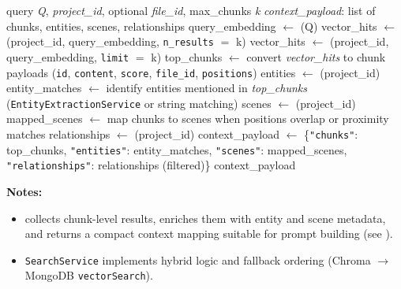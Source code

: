 \begin{algorithm}[H]
\caption{AssembleRAGContext}
\small\begin{algorithmic}[1]
\Require query \textit{Q}, \textit{project\_id}, optional \textit{file\_id}, max\_chunks \textit{k}
\Ensure \textit{context\_payload}: list of chunks, entities, scenes, relationships
\State query\_embedding $\leftarrow$ \texttt{}(Q)
    \State vector\_hits $\leftarrow$ \texttt{}(project\_id,
    \Statex \hspace{4em} query\_embedding, \texttt{n\_results} $=$ k)
\Else
    \State vector\_hits $\leftarrow$ \texttt{}(project\_id,
    \Statex \hspace{4em} query\_embedding, \texttt{limit} $=$ k)
\EndIf
\State top\_chunks $\leftarrow$ convert \textit{vector\_hits} to chunk payloads (\texttt{id}, \texttt{content}, \texttt{score}, \texttt{file\_id}, \texttt{positions})
    \State entities $\leftarrow$ \texttt{}(project\_id)
    \State entity\_matches $\leftarrow$ identify entities mentioned in \textit{top\_chunks}
    \Statex \hspace{2em} (\texttt{EntityExtractionService} or string matching)
\EndIf
{}
    \State scenes $\leftarrow$ \texttt{}(project\_id)
    \State mapped\_scenes $\leftarrow$ map chunks to scenes when positions overlap or proximity matches
\EndIf
{}
    \State relationships $\leftarrow$ \texttt{}(project\_id)
\EndIf
\State context\_payload $\leftarrow$ \{\texttt{"chunks"}: top\_chunks, \texttt{"entities"}: entity\_matches,
\Statex \hspace{2em} \texttt{"scenes"}: mapped\_scenes, \texttt{"relationships"}: relationships (filtered)\}
\State \Return context\_payload
\end{algorithmic}\normalsize
\end{algorithm}
\FloatBarrier

\textbf{Notes:}
\begin{itemize}
    \item \texttt{} collects chunk-level results, enriches them with entity and scene metadata, and returns a compact context mapping suitable for prompt building (see \texttt{}).
    \item \texttt{SearchService} implements hybrid logic and fallback ordering (Chroma $\rightarrow$ MongoDB \texttt{vectorSearch}).
\end{itemize}

